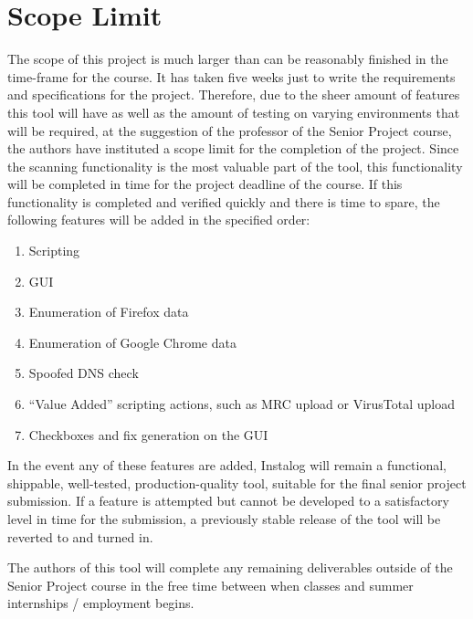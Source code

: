 \documentclass[letterpaper,12pt]{article}
\begin{document}
\section{Scope Limit} \label{scope_limit}
The scope of this project is much larger than can be reasonably finished in the
time-frame for the course.  It has taken five weeks just to write the
requirements and specifications for the project.  Therefore, due to the sheer
amount of features this tool will have as well as the amount of testing on
varying environments that will be required, at the suggestion of the professor
of the Senior Project course, the authors have instituted a scope limit for the
completion of the project.  Since the scanning functionality is the most
valuable part of the tool, this functionality will be completed in time for the
project deadline of the course.  If this functionality is completed and verified
quickly and there is time to spare, the following features will be added in the
specified order:

\begin{enumerate}
    \item Scripting 
    \item GUI 
    \item Enumeration of Firefox data
    \item Enumeration of Google Chrome data
    \item Spoofed DNS check
    \item ``Value Added'' scripting actions, such as MRC upload or VirusTotal
    upload
    \item Checkboxes and fix generation on the GUI
\end{enumerate}

In the event any of these features are added, Instalog will remain a functional,
shippable, well-tested, production-quality tool, suitable for the final senior
project submission.  If a feature is attempted but cannot be developed to a
satisfactory level in time for the submission, a previously stable release of
the tool will be reverted to and turned in.  

The authors of this tool will complete any remaining deliverables outside of the
Senior Project course in the free time between when classes and summer
internships / employment begins.  

\newpage
\end{document}
